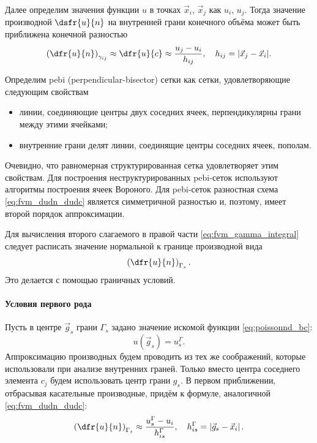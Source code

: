 Далее определим значения функции $u$ в точках $\vec x_i$, $\vec x_j$ как $u_i$, $u_j$.
Тогда значение производной $\dsfr{u}{n}$ на внутренней грани конечного объёма
может быть приближена конечной разностью
\begin{equation}
\label{eq:fvm_dudn_dudc}
\left(\dfr{u}{n}\right)_{\gamma_{ij}} \approx \dfr{u}{c} \approx \frac{u_j - u_i}{h_{ij}}, \quad h_{ij} = |\vec x_j - \vec x_i|.
\end{equation}

Определим pebi (perpendicular-bisector) сетки как сетки, удовлетворяющие следующим свойствам
\begin{itemize}
\item линии, соединяющие центры двух соседних ячеек, перпендикулярны грани между этими ячейками;
\item внутренние грани делят линии, соединящие центры соседних ячеек, пополам.
\end{itemize}
Очевидно, что равномерная структурированная сетка удовлетворяет этим свойствам.
Для построения неструктурированных pebi-сеток используют алгоритмы построения ячеек Вороного.
Для pebi-сеток разностная схема \eqref{eq:fvm_dudn_dudc}
является симметричной разностью и, поэтому, имеет второй порядок аппроксимации.

Для вычисления второго слагаемого в правой части 
\cref{eq:fvm_gamma_integral}
следует расписать значение нормальной 
к границе производной вида
$$
\left(\dfr{u}{n}\right)_{\Gamma_{s}}.
$$
Это делается с помощью граничных условий.

\paragraph{Условия первого рода}
Пусть в центре $\vec g_s$ грани $\Gamma_{s}$ задано 
значение искомой функции \cref{eq:poissonnd_bc}:
\begin{equation}
\label{eq:fvm_bc1}
u(\vec g_s) = u^\Gamma_s.
\end{equation}
Аппроксимацию производных
будем проводить из тех же соображений, которые использовали
при анализе внутренних граней. Только вместо центра соседнего элемента
$c_j$ будем использовать центр грани $g_s$.
В первом приближении, отбрасывая касательные производные, придём к формуле, аналогичной \cref{eq:fvm_dudn_dudc}:
\begin{equation}
\label{eq:fvm_bc1_approx}
\left(\dfr{u}{n}\right)_{\Gamma_s} \approx \frac{u^\Gamma_s - u_i}{h^\Gamma_{is}}, \quad h^\Gamma_{is} = \left| \vec g_s  - \vec x_i \right|.
\end{equation}

